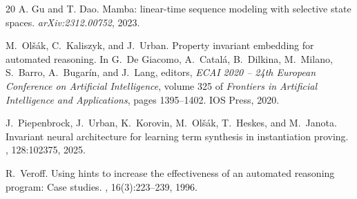 \documentclass{easychair}
\begin{document}
\begin{thebibliography}{20}
A. Gu and T. Dao.
\newblock Mamba: linear-time sequence modeling with selective state spaces.
\newblock \emph{arXiv:2312.00752}, 2023.

M.~Ol\v{s}ák, C.~Kaliszyk, and J.~Urban.
\newblock Property invariant embedding for automated reasoning.
\newblock In G.~De Giacomo, A.~Catal\'a, B.~Dilkina, M.~Milano,
S.~Barro, A.~Bugar\'in, and J.~Lang, editors,
{\em ECAI 2020 -- 24th European Conference on Artificial Intelligence},
volume 325 of {\em Frontiers in Artificial Intelligence and Applications},
pages 1395--1402. IOS Press, 2020.

J.~Piepenbrock, J.~Urban, K.~Korovin, M.~Ol\v{s}\'ak,
T.~Heskes, and M.~Janota.
\newblock Invariant neural architecture for learning term synthesis in
instantiation proving.
, 128:102375, 2025.

R.~Veroff.
\newblock Using hints to increase the effectiveness of an automated reasoning
program: Case studies.
, 16(3):223--239, 1996.

\end{thebibliography}
\end{document}

